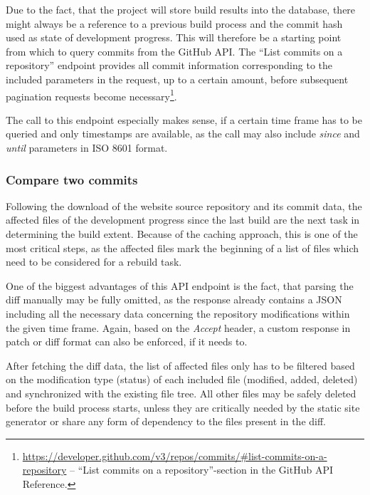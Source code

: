 Due to the fact, that the project will store build results into the database, there might always be a reference to a previous build process and the commit hash used as state of development progress. This will therefore be a starting point from which to query commits from the GitHub API. The ``List commits on a repository'' endpoint provides all commit information corresponding to the included parameters in the request, up to a certain amount, before subsequent pagination requests become necessary\footnote{\url{https://developer.github.com/v3/repos/commits/\#list-commits-on-a-repository} -- ``List commits on a repository''-section in the GitHub API Reference.}.

The call to this endpoint especially makes sense, if a certain time frame has to be queried and only timestamps are available, as the call may also include \emph{since} and \emph{until} parameters in ISO 8601 format.

\subsubsection{Compare two commits}
Following the download of the website source repository and its commit data, the affected files of the development progress since the last build are the next task in determining the build extent. Because of the caching approach, this is one of the most critical steps, as the affected files mark the beginning of a list of files which need to be considered for a rebuild task.

One of the biggest advantages of this API endpoint is the fact, that parsing the diff manually may be fully omitted, as the response already contains a JSON including all the necessary data concerning the repository modifications within the given time frame. Again, based on the \emph{Accept} header, a custom response in patch or diff format can also be enforced, if it needs to.

After fetching the diff data, the list of affected files only has to be filtered based on the modification type (status) of each included file (modified, added, deleted) and synchronized with the existing file tree. All other files may be safely deleted before the build process starts, unless they are critically needed by the static site generator or share any form of dependency to the files present in the diff.
